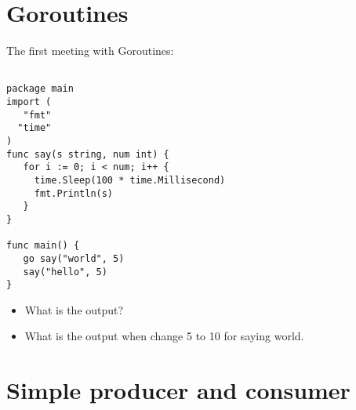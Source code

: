 \documentclass[11pt, letterpaper]{article}
\begin{document}
\section{Goroutines}

The first meeting with Goroutines:
\begin{verbatim}

package main
import (
   "fmt"
  "time"
)
func say(s string, num int) {
   for i := 0; i < num; i++ {
     time.Sleep(100 * time.Millisecond)
     fmt.Println(s)
   }
}

func main() {
   go say("world", 5)
   say("hello", 5)
}
\end{verbatim}


\begin{itemize}
\item What is the output?
\item What is the output when change 5 to 10 for saying world.
\end{itemize}

\section{Simple producer and consumer}
\end{document}
